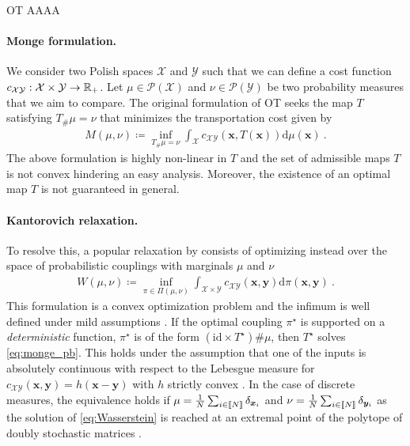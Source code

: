 \begin{mem1}{OT}
AAAA

\paragraph{Monge formulation.}
We consider two Polish spaces $\mathcal{X}$ and $\mathcal{Y}$ such that we can define a cost function $c_{\mathcal{X} \mathcal{Y}} : \mathcal{X} \times \mathcal{Y} \to \mathbb{R}_+$. Let $\mu \in \mathcal{P}(\mathcal{X})$ and $\nu \in \mathcal{P}(\mathcal{Y})$ be two probability measures that we aim to compare.
The original formulation \citep{monge1781memoire} of OT seeks the map $T$ satisfying $T_{\#}\mu = \nu$ that minimizes the transportation cost given by
\begin{align}\label{eq:monge_pb}
	M(\mu, \nu) \coloneqq \inf_{T_{\#}\mu = \nu} \int_{\mathcal{X}} c_{\mathcal{X} \mathcal{Y}}(\bm{x}, T(\bm{x})) \mathrm{d}\mu(\bm{x}) \:.
\end{align}
The above formulation is highly non-linear in $T$ and the set of admissible maps $T$ is not convex hindering an easy analysis. Moreover, the existence of an optimal map $T$ is not guaranteed in general.

\paragraph{Kantorovich relaxation.} To resolve this, a popular relaxation by \citep{kantorovich1942translocation} consists of optimizing instead over the space of probabilistic couplings with marginals $\mu$ and $\nu$
\begin{align}\label{eq:Wasserstein}
	W(\mu, \nu) \coloneqq \inf_{\pi \in \Pi(\mu, \nu)} \int_{\mathcal{X} \times \mathcal{Y}} c_{\mathcal{X} \mathcal{Y}}(\bm{x}, \bm{y}) \mathrm{d}\pi(\bm{x}, \bm{y}) \:.
\end{align}
This formulation is a convex optimization problem and the infimum is well
defined under mild assumptions \citep{santambrogio2015optimal}. If the optimal
coupling $\pi^\star$ is supported on a \emph{deterministic} function, \ie
$\pi^\star$ is of the form $(\mathrm{id} \times T^\star)\# \mu$, then
$T^\star$ solves \eqref{eq:monge_pb}. This holds under the assumption that one
of the inputs is absolutely continuous with respect to the Lebesgue measure
for $c_{\mathcal{X} \mathcal{Y}}(\bm{x}, \bm{y}) = h(\bm{x} - \bm{y})$ with
$h$ strictly convex \citep{gangbo1996geometry}. In the case of discrete
measures, the equivalence holds if $\mu = \frac{1}{N} \sum_{i \in {[\![N]\!]}}
\delta_{\bm{x}_i}$ and $\nu = \frac{1}{N} \sum_{i \in {[\![N]\!]}}
\delta_{\bm{y}_i}$ as the solution of \eqref{eq:Wasserstein} is reached at an
extremal point of the polytope of doubly stochastic matrices
\citep{bertsimas1997introduction}.

\end{mem1}


